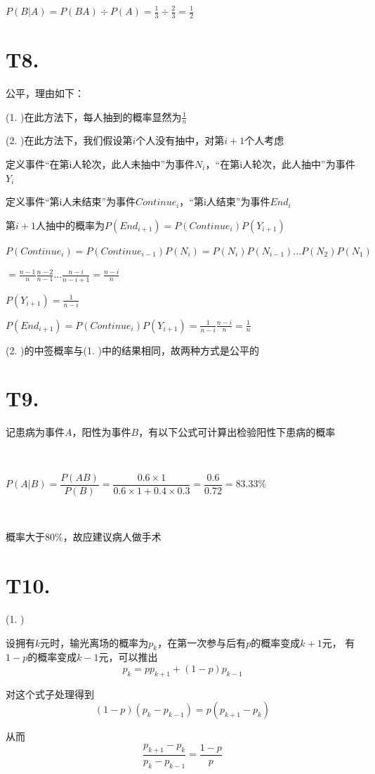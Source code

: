 \documentclass{article}
\begin{document}
$P(B|A)=P(BA)\div P(A)=\frac{1}{3}\div\frac{2}{3}=\frac{1}{2}$

\section*{T8. }

公平，理由如下：

(1. )在此方法下，每人抽到的概率显然为$\frac{1}{n}$

(2. )在此方法下，我们假设第$i$个人没有抽中，对第$i+1$个人考虑

定义事件“在第i人轮次，此人未抽中”为事件$N_i$，“在第i人轮次，此人抽中”为事件$Y_i$

定义事件“第i人未结束”为事件$Continue_i$，“第i人结束”为事件$End_i$

第$i+1$人抽中的概率为$P(End_{i+1})=P(Continue_i)P(Y_{i+1})$

$P(Continue_i)=P(Continue_{i-1})P(N_i)=P(N_i)P(N_{i-1})...P(N_2)P(N_1)$

$=\frac{n-1}{n}\frac{n-2}{n-1}...\frac{n-i}{n-i+1}=\frac{n-i}{n}$

$P(Y_{i+1})=\frac{1}{n-i}$

$P(End_{i+1})=P(Continue_i)P(Y_{i+1})=\frac{1}{n-i}\frac{n-i}{n}=\frac{1}{n}$

(2. )的中签概率与(1. )中的结果相同，故两种方式是公平的

\section*{T9. }

记患病为事件$A$，阳性为事件$B$，有以下公式可计算出检验阳性下患病的概率

~

$P(A|B)=\dfrac{P(AB)}{P(B)}=\dfrac{0.6 \times 1}{0.6 \times 1+0.4 \times 0.3}=\dfrac{0.6}{0.72}=83.33\%$

~

概率大于80$\%$，故应建议病人做手术

\section*{T10. }

(1. )

设拥有$k$元时，输光离场的概率为$p_k$，在第一次参与后有$p$的概率变成$k+1$元，
有$1-p$的概率变成$k-1$元，可以推出$$p_k=pp_{k+1}+(1-p)p_{k-1}$$

对这个式子处理得到$$(1-p)(p_k-p_{k-1})=p(p_{k+1}-p_k)$$

从而$$\frac{p_{k+1}-p_k}{p_k-p_{k-1}}=\frac{1-p}{p}$$
\end{document}
